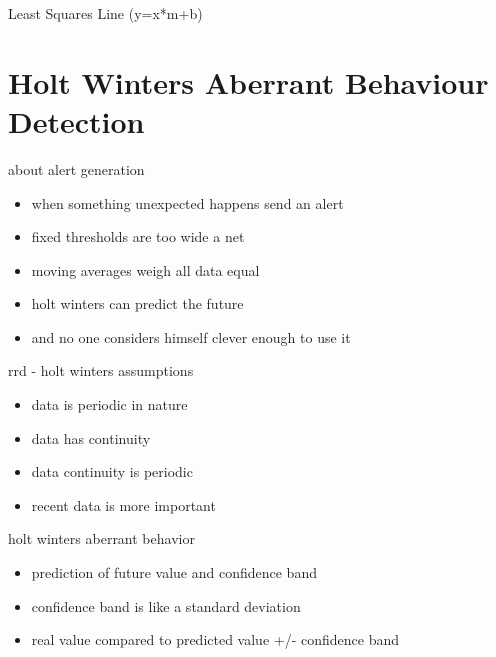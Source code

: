 \begin{frame}{Least Squares Line (y=x*m+b)}
\end{frame}

\section{Holt Winters Aberrant Behaviour Detection}

\begin{frame}{about alert generation}
\begin{itemize}[<+-| alert@+>]
\item when something unexpected happens send an alert
\item fixed thresholds are too wide a net
\item moving averages weigh all data equal
\item holt winters can predict the future
\item and no one considers himself clever enough to use it
\end{itemize}
\end{frame}

\begin{frame}{rrd - holt winters assumptions}
\begin{itemize}[<+-| alert@+>]
\item data is periodic in nature
\item data has continuity 
\item data continuity is periodic
\item recent data is more important
\end{itemize}
\end{frame}

\begin{frame}{holt winters aberrant behavior}
\begin{itemize}[<+-| alert@+>]
\item prediction of future value and confidence band
\item confidence band is like a standard deviation
\item real value compared to predicted value +/- confidence band
\end{itemize}
\end{frame}


